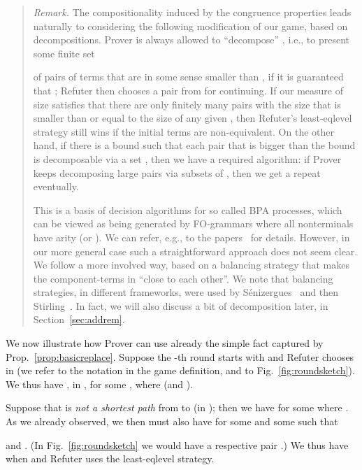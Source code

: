 \documentclass{llncs}
\begin{document}
\begin{quote}
{\small
\emph{Remark.}	
The compositionality induced by the congruence properties leads
naturally to considering the following modification of our game, based
on decompositions.
Prover is always allowed to 
``decompose'' , 
i.e., to present
some finite set

of pairs of terms that are in some sense smaller
than , if it is guaranteed that
; 
Refuter then chooses a pair from  for continuing.
If our measure of size satisfies 
that there are only finitely many pairs with the size 
that is smaller than or equal to the size of any given , then 
Refuter's least-eqlevel strategy still wins if the initial terms are
non-equivalent. On the other hand, if there is a bound such that each
pair  that is bigger than the bound is decomposable via a set
, then we have a required algorithm: 
if Prover keeps decomposing large pairs via subsets of , then we
get a repeat eventually. 

This is a basis of decision algorithms for so called BPA processes,
which can be viewed as being generated by FO-grammars where all
nonterminals have arity  (or ).
We can refer, e.g., to the
papers~\cite{DBLP:journals/iandc/ChristensenHS95,DBLP:conf/mfcs/BurkartCS95,Jan12b}
for details. 
However, in our more general case such a straightforward approach
does not seem clear. We follow a more involved way, based on a balancing
strategy that makes the component-terms in  
``close to each other''. 
We note that 
balancing strategies, in different frameworks, 
were used by 
S\'enizergues~\cite{Senizergues:TCS2001,Senizergues:TCS2002simple,Seni05}
and then Stirling~\cite{Stirling:TCS2001,Stir:DPDA:prim,stirling-pda-00}.
In fact, we will also discuss 
a bit of decomposition later, in Section~\ref{sec:addrem}.
}
\end{quote}
We now illustrate how Prover can use already the simple fact captured by
Prop.~\ref{prop:basicreplace}.
Suppose the -th round 
starts with  and Refuter chooses 
 in  (we refer to the notation in the game
definition, and to Fig.~\ref{fig:roundsketch}).
We thus have ,  in ,
for some , where   (and ).

Suppose that  is \emph{not a shortest path} from 
 to  (in );
then we have  for some  
where . As we already observed,  we then must also have 
 for some  and some  such that 
 
and .
(In Fig.~\ref{fig:roundsketch} we would have a respective pair
.)
We thus have   when  and Refuter uses the least-eqlevel strategy.
\end{document}
